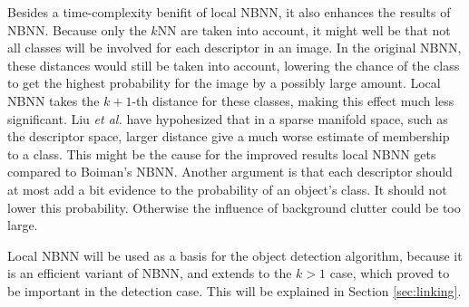 Besides a time-complexity benifit of local NBNN, it also enhances the results of NBNN. Because only the $k$NN are taken into account, it might well be that not all classes will be involved for each descriptor in an image. In the original NBNN, these distances would still be taken into account, lowering the chance of the class to get the highest probability for the image by a possibly large amount. Local NBNN takes the $k+1$-th distance for these classes, making this effect much less significant. Liu \emph{et al.}\cite{liu2011defense} have hypohesized that in a sparse manifold space, such as the descriptor space, larger distance give a much worse estimate of membership to a class. This might be the cause for the improved results local NBNN gets compared to Boiman's NBNN. Another argument is that each descriptor should at most add a bit evidence to the probability of an object's class. It should not lower this probability. Otherwise the influence of background clutter could be too large.


Local NBNN will be used as a basis for the object detection algorithm, because it is an efficient variant of NBNN, and extends to the $k>1$ case, which proved to be important in the detection case. This will be explained in Section \ref{sec:linking}.

\begin{figure}[hbt]
    \centering
\end{figure}


